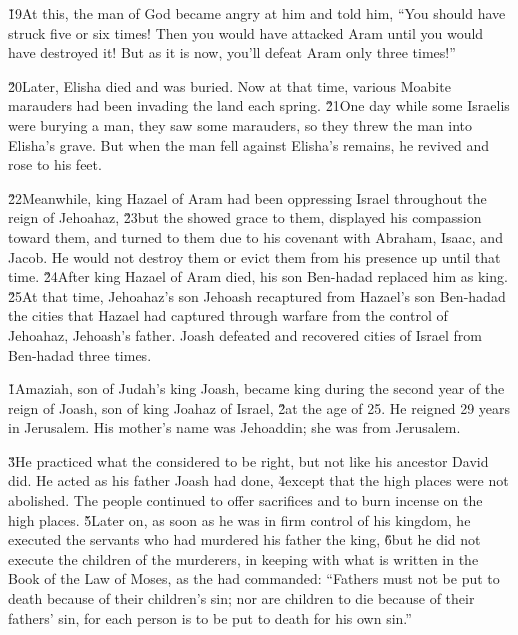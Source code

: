 \v{19}At this, the man of God became angry at him and told him, ``You should have struck five or six times! Then you would have attacked Aram until you would have destroyed it! But as it is now, you'll defeat Aram only three times!''

\v{20}Later, Elisha died and was buried. Now at that time, various Moabite marauders had been invading the land each spring. \v{21}One day while some Israelis were burying a man, they saw some marauders, so they threw the man into Elisha's grave. But when the man fell against Elisha's remains, he revived and rose to his feet.

\v{22}Meanwhile, king Hazael of Aram had been oppressing Israel throughout the reign of Jehoahaz, \v{23}but the  showed grace to them, displayed his compassion toward them, and turned to them due to his covenant with Abraham, Isaac, and Jacob. He would not destroy them or evict them from his presence up until that time. \v{24}After king Hazael of Aram died, his son Ben-hadad replaced him as king. \v{25}At that time, Jehoahaz's son Jehoash recaptured from Hazael's son Ben-hadad the cities that Hazael had captured through warfare from the control of Jehoahaz, Jehoash's father. Joash defeated and recovered cities of Israel from Ben-hadad three times.

\v{1}Amaziah, son of Judah's king Joash, became king during the second year of the reign of Joash, son of king Joahaz of Israel, \v{2}at the age of 25. He reigned 29 years in Jerusalem. His mother's name was Jehoaddin; she was from Jerusalem.

\v{3}He practiced what the  considered to be right, but not like his ancestor David did. He acted as his father Joash had done, \v{4}except that the high places were not abolished. The people continued to offer sacrifices and to burn incense on the high places. \v{5}Later on, as soon as he was in firm control of his kingdom, he executed the servants who had murdered his father the king, \v{6}but he did not execute the children of the murderers, in keeping with what is written in the Book of the Law of Moses, as the  had commanded: ``Fathers must not be put to death because of their children's sin; nor are children to die because of their fathers' sin, for each person is to be put to death for his own sin.''

